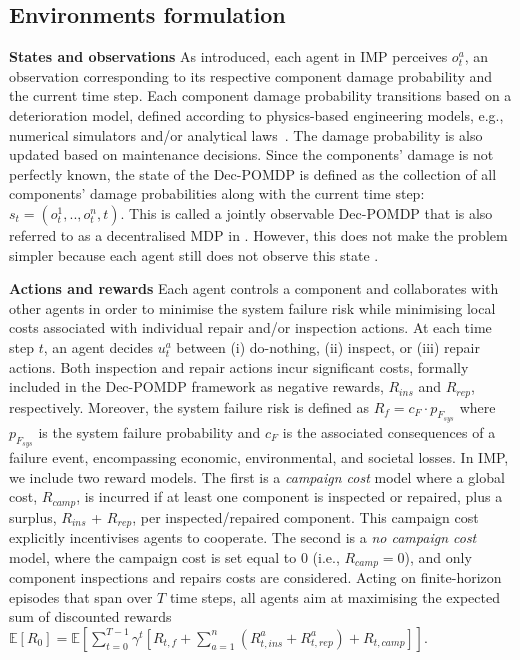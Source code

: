 \subsection{Environments formulation}
\label{sec:env_formulation}
\textbf{States and observations}
As introduced, each agent in IMP perceives $o^a_t$, an observation corresponding to its respective component damage probability and the current time step.
Each component damage probability transitions based on a deterioration model, defined according to physics-based engineering models, e.g., numerical simulators and/or analytical laws~\citep{Papakonstantinou2014Part1}.
The damage probability is also updated based on maintenance decisions.
Since the components' damage is not perfectly known, the state of the Dec-POMDP is defined as the collection of all components' damage probabilities along with the current time step: $s_t = (o_t^1, .., o_t^n, t)$.
This is called a jointly observable Dec-POMDP that is also referred to as a decentralised MDP in \citep{DecPomdp}.
However, this does not make the problem simpler because each agent still does not observe this state \citep{bernstein2002complexity}.


\textbf{Actions and rewards}
Each agent controls a component and collaborates with other agents in order to minimise the system failure risk while minimising local costs associated with individual repair and/or inspection actions. 
At each time step $t$, an agent decides $u^a_t$ between (i) do-nothing, (ii) inspect, or (iii) repair actions.
Both inspection and repair actions incur significant costs, formally included in the Dec-POMDP framework as negative rewards, $R_{ins}$ and $R_{rep}$, respectively.
Moreover, the system failure risk is defined as $R_f= c_F \cdot p_{F_{sys}}$ where $p_{F_{sys}}$ is the system failure probability and $c_F$ is the associated consequences of a failure event, encompassing economic, environmental, and societal losses.
In IMP, we include two reward models.
The first is a \emph{campaign cost} model where a global cost, $R_{camp}$, is incurred if at least one component is inspected or repaired, plus a surplus, $R_{ins}$ + $R_{rep}$, per inspected/repaired component.
This campaign cost explicitly incentivises agents to cooperate.
The second is a \emph{no campaign cost} model, where the campaign cost is set equal to 0 (i.e., $R_{camp}=0$), and only component inspections and repairs costs are considered. 
Acting on finite-horizon episodes that span over $T$ time steps, all agents aim at maximising the expected sum of discounted rewards $\mathbb{E}[R_{0}] = \mathbb{E} \left[ \sum_{t=0}^{T-1} \gamma^t \left[ R_{t,f}+ \sum_{a=1}^n \left({R_{t,ins}^a} + {R_{t,rep}^a}\right)+R_{t,camp} \right] \right]$.

